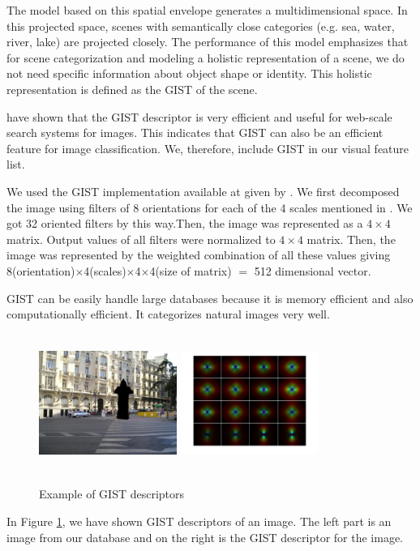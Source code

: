 The model based on this spatial envelope generates a multidimensional space. In this projected space, scenes with semantically close categories (e.g. sea, water, river, lake) are projected closely. The performance of this model emphasizes that for scene categorization and modeling a holistic representation of a scene, we do not need specific information about object shape or identity. This holistic representation is defined as the GIST of the scene.

\citet*{douze} have shown that the GIST descriptor is very efficient and useful for web-scale search systems for images. This indicates that GIST can also be an efficient feature for image classification. We, therefore, include GIST in our visual feature list.

We used the GIST implementation available at \citet*{gistWebSite} given by \citet*{GIST}. We first decomposed the image using filters of 8 orientations for each of the 4 scales mentioned in \citet*{GIST}. We got 32 oriented filters by this way.Then, the image was represented as a $4 \times 4 $ matrix. Output values of all filters were normalized to $4 \times 4 $ matrix. Then, the image was represented by the weighted combination of all these values giving 8(orientation)$\times$4(scales)$\times$4$\times$4(size of matrix) $=$ 512 dimensional vector.

GIST can be easily handle large databases because it is memory efficient and also computationally efficient. It categorizes natural 
images very well.
\begin{center}
\begin{figure}	
\centering
\includegraphics[width=4.5cm, height=4.5cm]{./Pictures/GIST/gistImage.jpg}
\includegraphics[width=4.5cm, height=4.5cm]{./Pictures/GIST/gistExample.jpg}
\caption{Example of GIST descriptors}
\label{fig:gistExample}
\end{figure}
\end{center}
In Figure \ref{fig:gistExample}, we have shown GIST descriptors of an image. The left part is an image from our database and on the 
right is the GIST descriptor for the image.

